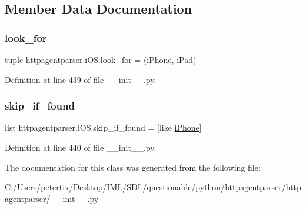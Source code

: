 \subsection{Member Data Documentation}
\hypertarget{classhttpagentparser_1_1i_o_s_af7f9a185ba4791b5046ffe710224a8e3}{}\label{classhttpagentparser_1_1i_o_s_af7f9a185ba4791b5046ffe710224a8e3} 
\subsubsection{\texorpdfstring{look\+\_\+for}{look\_for}}
{\footnotesize\ttfamily tuple httpagentparser.\+i\+O\+S.\+look\+\_\+for = (\textquotesingle{}\hyperlink{classhttpagentparser_1_1i_phone}{i\+Phone}\textquotesingle{}, \textquotesingle{}i\+Pad\textquotesingle{})\hspace{0.3cm}{\ttfamily [static]}}



Definition at line 439 of file \+\_\+\+\_\+init\+\_\+\+\_\+.\+py.

\hypertarget{classhttpagentparser_1_1i_o_s_a3c7dba3ed9383a492aae82cd2c2f2e72}{}\label{classhttpagentparser_1_1i_o_s_a3c7dba3ed9383a492aae82cd2c2f2e72} 
\subsubsection{\texorpdfstring{skip\+\_\+if\+\_\+found}{skip\_if\_found}}
{\footnotesize\ttfamily list httpagentparser.\+i\+O\+S.\+skip\+\_\+if\+\_\+found = \mbox{[}\textquotesingle{}like \hyperlink{classhttpagentparser_1_1i_phone}{i\+Phone}\textquotesingle{}\mbox{]}\hspace{0.3cm}{\ttfamily [static]}}



Definition at line 440 of file \+\_\+\+\_\+init\+\_\+\+\_\+.\+py.



The documentation for this class was generated from the following file\+:\begin{DoxyCompactItemize}
\item 
C\+:/\+Users/petertix/\+Desktop/\+I\+M\+L/\+S\+D\+L/questionable/python/httpagentparser/httpagentparser/\hyperlink{____init_____8py}{\+\_\+\+\_\+init\+\_\+\+\_\+.\+py}\end{DoxyCompactItemize}
